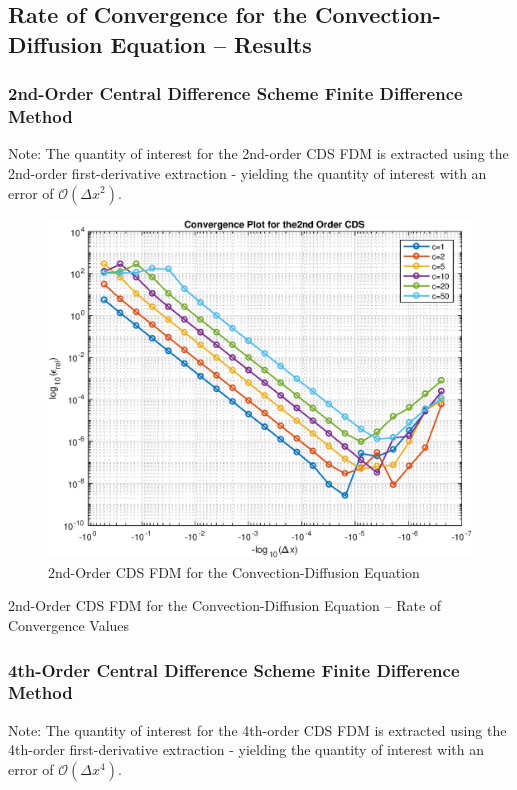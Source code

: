 \documentclass[10pt]{article}		%
\numberwithin{equation}{section}
\begin{document}
\newpage

\subsection{Rate of Convergence for the Convection-Diffusion Equation -- Results}

\subsubsection{2nd-Order Central Difference Scheme Finite Difference Method}

Note: The quantity of interest for the 2nd-order CDS FDM is extracted using the 2nd-order first-derivative extraction - yielding the quantity of interest with an error of $\mathcal{O}(\Delta x^2)$.

\begin{figure}[H]
	\begin{center}
		\includegraphics[width = 0.45\linewidth]{convergence_2nd_order_cds}
		\caption{2nd-Order CDS FDM for the Convection-Diffusion Equation}	
	\end{center}
\end{figure}

\begin{table}[H]
	
	\caption{2nd-Order CDS FDM for the Convection-Diffusion Equation -- Rate of Convergence Values}	
\end{table}

\newpage

\subsubsection{4th-Order Central Difference Scheme Finite Difference Method}

Note: The quantity of interest for the 4th-order CDS FDM is extracted using the 4th-order first-derivative extraction - yielding the quantity of interest with an error of $\mathcal{O}(\Delta x^4)$.
\end{document}
